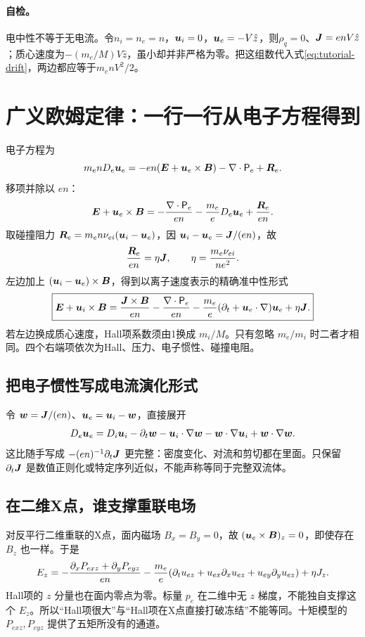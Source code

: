 \documentclass[UTF8,a4paper,11pt,openany,fontset=fandol]{ctexbook}
\begin{document}
\paragraph{自检。}
电中性不等于无电流。令$n_i=n_e=n$，$\bm{u}_i=0$，$\bm{u}_e=-V\hat z$，则$\rho_q=0$、$\bm{J}=enV\hat z$；质心速度为$-(m_e/M)V\hat z$，虽小却并非严格为零。把这组数代入式\eqref{eq:tutorial-drift}，两边都应等于$m_enV^2/2$。


\section{广义欧姆定律：一行一行从电子方程得到}
电子方程为
\begin{equation}m_enD_e\bm{u}_e=-en(\bm{E}+\bm{u}_e\times\bm{B})-\nabla\cdot\mathsf P_e+\bm{R}_e.
\end{equation}
移项并除以 $en$：
\begin{equation}\bm{E}+\bm{u}_e\times\bm{B}=-{\nabla\cdot\mathsf P_e\over en}-{m_e\over e}D_e\bm{u}_e+{\bm{R}_e\over en}.\label{eq:electronohm}\end{equation}
取碰撞阻力 $\bm{R}_e=m_en\nu_{ei}(\bm{u}_i-\bm{u}_e)$，因 $\bm{u}_i-\bm{u}_e=\bm{J}/(en)$，故
\begin{equation}{\bm{R}_e\over en}=\eta\bm{J},\qquad \eta={m_e\nu_{ei}\over ne^2}.
\end{equation}
左边加上 $(\bm{u}_i-\bm{u}_e)\times\bm{B}$，得到以离子速度表示的精确准中性形式
\begin{equation}
\boxed{\bm{E}+\bm{u}_i\times\bm{B}={\bm{J}\times\bm{B}\over en}-{\nabla\cdot\mathsf P_e\over en}
-{m_e\over e}(\partial_t+\bm{u}_e\cdot\nabla)\bm{u}_e+\eta\bm{J}.}\label{eq:gohm}
\end{equation}
若左边换成质心速度，Hall项系数须由1换成 $m_i/M$。只有忽略 $m_e/m_i$ 时二者才相同。四个右端项依次为Hall、压力、电子惯性、碰撞电阻。

\subsection{把电子惯性写成电流演化形式}
令 $\bm{w}=\bm{J}/(en)$、$\bm{u}_e=\bm{u}_i-\bm{w}$，直接展开
\begin{equation}
D_e\bm{u}_e=D_i\bm{u}_i-\partial_t\bm{w}-\bm{u}_i\cdot\nabla\bm{w}-\bm{w}\cdot\nabla\bm{u}_i+\bm{w}\cdot\nabla\bm{w}.\label{eq:inertiaexpanded}
\end{equation}
这比随手写成 $-(en)^{-1}\partial_t\bm{J}$ 更完整：密度变化、对流和剪切都在里面。只保留 $\partial_t\bm{J}$ 是数值正则化或特定序列近似，不能声称等同于完整双流体。

\subsection{在二维X点，谁支撑重联电场}
对反平行二维重联的X点，面内磁场 $B_x=B_y=0$，故 $(\bm{u}_e\times\bm{B})_z=0$，即使存在 $B_z$ 也一样。于是
\begin{equation}
E_z=-{\partial_xP_{exz}+\partial_yP_{eyz}\over en}
-{m_e\over e}(\partial_tu_{ez}+u_{ex}\partial_xu_{ez}+u_{ey}\partial_yu_{ez})+\eta J_z.\label{eq:xpoint}
\end{equation}
Hall项的 $z$ 分量也在面内零点为零。标量 $p_e$ 在二维中无 $z$ 梯度，不能独自支撑这个 $E_z$。所以“Hall项很大”与“Hall项在X点直接打破冻结”不能等同。十矩模型的 $P_{exz},P_{eyz}$ 提供了五矩所没有的通道。\citep{Wang2015}
\end{document}
